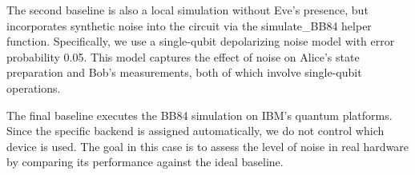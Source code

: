 The second baseline is also a local simulation without Eve’s presence, but incorporates synthetic noise into the circuit via the simulate\_BB84 helper function. Specifically, we use a single-qubit depolarizing noise model with error probability 0.05. This model captures the effect of noise on Alice’s state preparation and Bob’s measurements, both of which involve single-qubit operations.

The final baseline executes the BB84 simulation on IBM’s quantum platforms. Since the specific backend is assigned automatically, we do not control which device is used. The goal in this case is to assess the level of noise in real hardware by comparing its performance against the ideal baseline.


